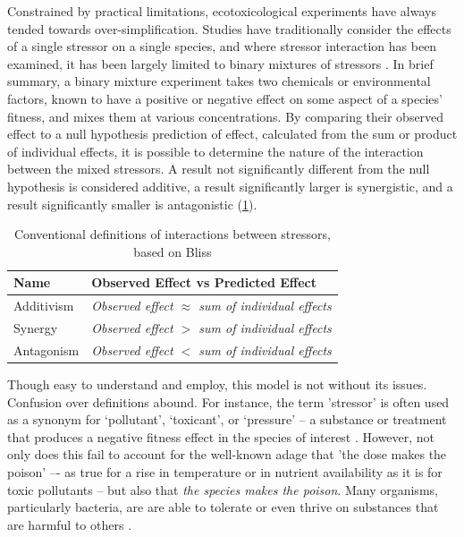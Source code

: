 \documentclass[10pt]{article}
\begin{document}
Constrained by practical limitations, ecotoxicological experiments have always tended towards over-simplification. Studies have traditionally consider the effects of a single stressor on a single species, and where stressor interaction has been examined, it has been largely limited to binary mixtures of stressors \cite{Peterson2017}. In brief summary, a binary mixture experiment takes two chemicals or environmental factors, known to have a positive or negative effect on some aspect of a species' fitness, and mixes them at various concentrations. By comparing their observed effect to a null hypothesis prediction of effect, calculated from the sum or product of individual effects, it is possible to determine the nature of the interaction between the mixed stressors. A result not significantly different from the null hypothesis is considered additive, a result significantly larger is synergistic, and a result significantly smaller is antagonistic (\cref{tab:simple_interactions}). 

\begin{table}[ht]
\caption{Conventional definitions of interactions between stressors, based on Bliss \cite{Bliss1939}}
\centering
\begin{tabular}{l l}
\toprule 
\textbf{Name} & \textbf{Observed Effect vs Predicted Effect} \\
\midrule
\rowcolor{gggrey}   Additivism      &   \textit{Observed effect $\approx$ sum of individual effects} \\
                    Synergy         &   \textit{Observed effect $>$ sum of individual effects} \\
\rowcolor{gggrey}   Antagonism      &   \textit{Observed effect $<$ sum of individual effects} \\
\bottomrule
\end{tabular}
\label{tab:simple_interactions}
\end{table}

Though easy to understand and employ, this model is not without its issues. Confusion over definitions abound. For instance, the term 'stressor' is often used as a synonym for `pollutant', `toxicant', or `pressure' -- a substance or treatment that produces a negative fitness effect in the species of interest \cite{Piggott2015}. However, not only does this fail to account for the well-known adage that 'the dose makes the poison'\cite{OGParacelsus} –- as true for a rise in temperature or in nutrient availability as it is for toxic pollutants -- but also that \textit{the species makes the poison}. Many organisms, particularly bacteria, are are able to tolerate or even thrive on substances that are harmful to others \cite{Malik2004,Gadd2009}. 
\end{document}
